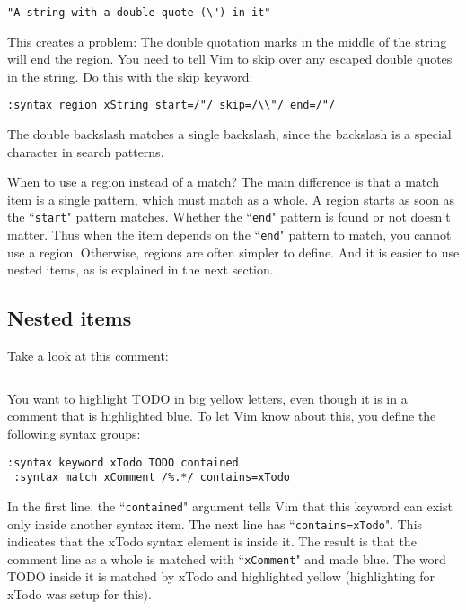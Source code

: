 \begin{Verbatim}[samepage=true]
    "A string with a double quote (\") in it" 
\end{Verbatim}

This creates a problem: The double quotation marks in the middle of the string will end the region.
You need to tell Vim to skip over any escaped double quotes in the string.
Do this with the skip keyword:

\begin{Verbatim}[samepage=true]
 :syntax region xString start=/"/ skip=/\\"/ end=/"/
\end{Verbatim}

The double backslash matches a single backslash, since the backslash is a special character in search patterns.

When to use a region instead of a match?
The main difference is that a match item is a single pattern, which must match as a whole.
A region starts as soon as the ``\texttt{start}" pattern matches.
Whether the ``\texttt{end}" pattern is found or not doesn't matter.
Thus when the item depends on the ``\texttt{end}" pattern to match, you cannot use a region.
Otherwise, regions are often simpler to define.
And it is easier to use nested items, as is explained in the next section.
\subsection{Nested items}
Take a look at this comment:

\begin{Verbatim}[samepage=true]
    %Get input  TODO: Skip white space 
\end{Verbatim}

You want to highlight TODO in big yellow letters, even though it is in a comment that is highlighted blue.
To let Vim know about this, you define the following syntax groups:

\begin{Verbatim}[samepage=true]
 :syntax keyword xTodo TODO contained
 :syntax match xComment /%.*/ contains=xTodo
\end{Verbatim}

In the first line, the ``\texttt{contained}" argument tells Vim that this keyword can exist only inside another syntax item.
The next line has ``\texttt{contains=xTodo}".
This indicates that the xTodo syntax element is inside it.
The result is that the comment line as a whole is matched with ``\texttt{xComment}" and made blue.
The word TODO inside it is matched by xTodo and highlighted yellow (highlighting for xTodo was setup for this).

